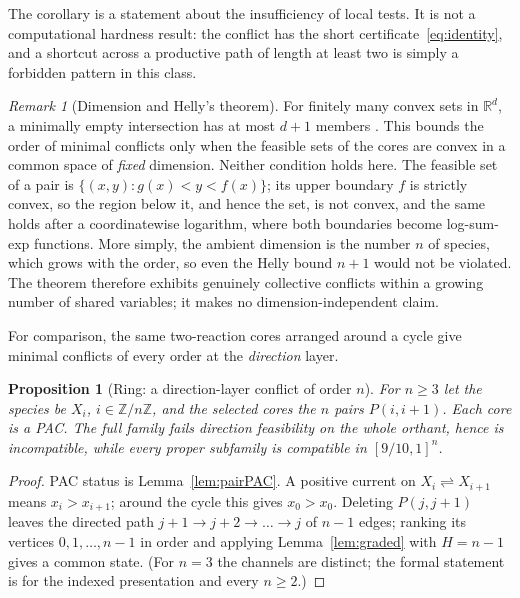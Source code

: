 \documentclass[11pt,a4paper]{article}
\theoremstyle{plain}
\newtheorem{proposition}[theorem]{Proposition}
\theoremstyle{definition}
\theoremstyle{remark}
\newtheorem{remark}[theorem]{Remark}
\newcommand{\R}{\mathbb{R}}
\newcommand{\Z}{\mathbb{Z}}
\newcommand{\rev}{\rightleftharpoons}
\begin{document}
The corollary is a statement about the insufficiency of local tests. It is not a computational hardness result: the conflict has the short certificate~\eqref{eq:identity}, and a shortcut across a productive path of length at least two is simply a forbidden pattern in this class.

\begin{remark}[Dimension and Helly's theorem]\label{rem:helly}
For finitely many convex sets in $\R^d$, a minimally empty intersection has at most $d+1$ members \citep{helly1923,eckhoff1993}. This bounds the order of minimal conflicts only when the feasible sets of the cores are convex in a common space of \emph{fixed} dimension. Neither condition holds here. The feasible set of a pair is $\{(x,y):g(x)<y<f(x)\}$; its upper boundary $f$ is strictly convex, so the region below it, and hence the set, is not convex, and the same holds after a coordinatewise logarithm, where both boundaries become log-sum-exp functions. More simply, the ambient dimension is the number $n$ of species, which grows with the order, so even the Helly bound $n+1$ would not be violated. The theorem therefore exhibits genuinely collective conflicts within a growing number of shared variables; it makes no dimension-independent claim.
\end{remark}

For comparison, the same two-reaction cores arranged around a cycle give minimal conflicts of every order at the \emph{direction} layer.

\begin{proposition}[Ring: a direction-layer conflict of order $n$]\label{prop:ring}
For $n\ge3$ let the species be $X_i$, $i\in\Z/n\Z$, and the selected cores the $n$ pairs $P(i,i+1)$. Each core is a PAC. The full family fails direction feasibility on the whole orthant, hence is incompatible, while every proper subfamily is compatible in $[9/10,1]^n$.
\end{proposition}
\begin{proof}
PAC status is Lemma~\ref{lem:pairPAC}. A positive current on $X_i\rev X_{i+1}$ means $x_i>x_{i+1}$; around the cycle this gives $x_0>x_0$. Deleting $P(j,j+1)$ leaves the directed path $j+1\to j+2\to\dots\to j$ of $n-1$ edges; ranking its vertices $0,1,\dots,n-1$ in order and applying Lemma~\ref{lem:graded} with $H=n-1$ gives a common state. (For $n=3$ the channels are distinct; the formal statement is for the indexed presentation and every $n\ge2$.)
\end{proof}
\end{document}

